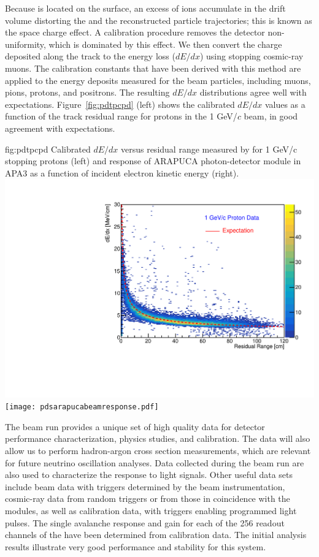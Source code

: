 Because  is located on the surface,  an excess of ions accumulate in the drift volume %
distorting the \efield and the reconstructed particle trajectories; this is known as the space charge effect. %
A calibration procedure removes the detector non-uniformity, which is dominated by this effect. %
We then convert the charge deposited along the track to the energy loss ($dE/dx$) using stopping cosmic-ray muons. The calibration constants that have been derived with this method are applied to the energy deposits measured for the beam particles, including muons, pions, protons, and positrons.
The resulting $dE/dx$ distributions agree well with expectations.  Figure~\ref{fig:pdtpcpd} (left) shows the calibrated $dE/dx$ values as a function of the track residual range for protons in the 1 GeV/$c$ beam, in good agreement with expectations. 

\begin{dunefigure}
{fig:pdtpcpd}
{Calibrated $dE/dx$ versus residual range measured by  for 1 GeV/c stopping protons (left) and response of ARAPUCA photon-detector module in APA3 as a function of incident electron kinetic energy (right).} \includegraphics[width=0.47\linewidth]{graphics/dedx_rr_data_v5.pdf}
\texttt{[image: pdsarapucabeamresponse.pdf]}
\end{dunefigure}


The  beam run provides a unique set of high quality data for detector performance characterization, physics studies, and calibration. The data will also
allow us to perform hadron-argon cross section measurements, which are relevant for future  neutrino oscillation analyses.
Data collected during the beam run are also used to characterize the  response to light signals. Other useful data sets include
beam data with triggers determined by the beam instrumentation, cosmic-ray data  from random triggers or from those in coincidence with the  modules, as well as calibration data, with triggers enabling programmed light pulses. 
The single avalanche response and gain for each of the 256 readout channels of the  have been determined from calibration data.
The initial analysis results illustrate very good performance and stability for this system.

